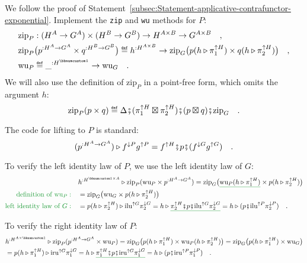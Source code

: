 We follow the proof of Statement~\ref{subsec:Statement-applicative-contrafunctor-exponential}.
Implement the \lstinline!zip! and \lstinline!wu! methods for $P$:
\begin{align*}
 & \text{zip}_{P}:(H^{A}\rightarrow G^{A})\times(H^{B}\rightarrow G^{B})\rightarrow H^{A\times B}\rightarrow G^{A\times B}\quad,\\
 & \text{zip}_{P}\big(p^{:H^{A}\rightarrow G^{A}}\times q^{:H^{B}\rightarrow G^{B}}\big)\triangleq h^{:H^{A\times B}}\rightarrow\text{zip}_{G}\big(p(h\triangleright\pi_{1}^{\uparrow H})\times q(h\triangleright\pi_{2}^{\uparrow H})\big)\quad,\\
 & \text{wu}_{P}\triangleq\_^{:H^{\bbnum 1}}\rightarrow\text{wu}_{G}\quad.
\end{align*}
We will also use the definition of $\text{zip}_{P}$ in a point-free
form, which omits the argument $h$:
\[
\text{zip}_{P}(p\times q)\triangleq\Delta\bef(\pi_{1}^{\uparrow H}\boxtimes\pi_{2}^{\uparrow H})\bef(p\boxtimes q)\bef\text{zip}_{G}\quad.
\]

The code for lifting to $P$ is standard:
\[
(p^{:H^{A}\rightarrow G^{A}})\triangleright f^{\downarrow P}g^{\uparrow P}=f^{\uparrow H}\bef p\bef(f^{\downarrow G}g^{\uparrow G})\quad.
\]

To verify the left identity law of $P$, we use the left identity
law of $G$:
\begin{align*}
 & h^{:H^{\bbnum 1\times A}}\triangleright\text{zip}_{P}(\text{wu}_{P}\times p^{:H^{A}\rightarrow G^{A}})=\text{zip}_{G}\big(\gunderline{\text{wu}_{P}(h\triangleright\pi_{1}^{\uparrow H})}\times p(h\triangleright\pi_{2}^{\uparrow H})\big)\\
{\color{greenunder}\text{definition of }\text{wu}_{P}:}\quad & =\text{zip}_{G}\big(\text{wu}_{G}\times p(h\triangleright\pi_{2}^{\uparrow H})\big)\\
{\color{greenunder}\text{left identity law of }G:}\quad & =p(h\triangleright\pi_{2}^{\uparrow H})\triangleright\text{ilu}^{\uparrow G}\pi_{2}^{\downarrow G}=h\triangleright\gunderline{\pi_{2}^{\uparrow H}\bef p\bef\text{ilu}^{\uparrow G}\pi_{2}^{\downarrow G}}=h\triangleright(p\bef\text{ilu}^{\uparrow P}\pi_{2}^{\downarrow P})\quad.
\end{align*}

To verify the right identity law of $P$:
\begin{align*}
 & h^{:H^{A\times\bbnum 1}}\triangleright\text{zip}_{P}(p^{:H^{A}\rightarrow G^{A}}\times\text{wu}_{P})=\text{zip}_{G}\big(p(h\triangleright\pi_{1}^{\uparrow H})\times\text{wu}_{P}(h\triangleright\pi_{2}^{\uparrow H})\big)=\text{zip}_{G}\big(p(h\triangleright\pi_{1}^{\uparrow H})\times\text{wu}_{G}\big)\\
 & =p(h\triangleright\pi_{1}^{\uparrow H})\triangleright\text{iru}^{\uparrow G}\pi_{1}^{\downarrow G}=h\triangleright\gunderline{\pi_{1}^{\uparrow H}\bef p\bef\text{iru}^{\uparrow G}\pi_{1}^{\downarrow G}}=h\triangleright(p\bef\text{iru}^{\uparrow P}\pi_{1}^{\downarrow P})\quad.
\end{align*}

